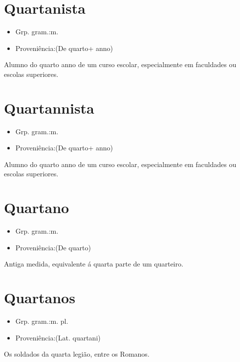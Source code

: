 \section{Quartanista}
\begin{itemize}
\item {Grp. gram.:m.}
\end{itemize}
\begin{itemize}
\item {Proveniência:(De \textunderscore quarto\textunderscore  + \textunderscore anno\textunderscore )}
\end{itemize}
Alumno do quarto anno de um curso escolar, especialmente em faculdades ou escolas superiores.
\section{Quartannista}
\begin{itemize}
\item {Grp. gram.:m.}
\end{itemize}
\begin{itemize}
\item {Proveniência:(De \textunderscore quarto\textunderscore  + \textunderscore anno\textunderscore )}
\end{itemize}
Alumno do quarto anno de um curso escolar, especialmente em faculdades ou escolas superiores.
\section{Quartano}
\begin{itemize}
\item {Grp. gram.:m.}
\end{itemize}
\begin{itemize}
\item {Proveniência:(De \textunderscore quarto\textunderscore )}
\end{itemize}
Antiga medida, equivalente á quarta parte de um quarteiro.
\section{Quartanos}
\begin{itemize}
\item {Grp. gram.:m. pl.}
\end{itemize}
\begin{itemize}
\item {Proveniência:(Lat. \textunderscore quartani\textunderscore )}
\end{itemize}
Os soldados da quarta legião, entre os Romanos.
